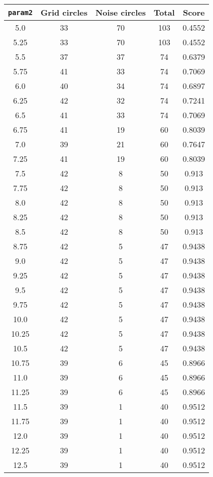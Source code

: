 \documentclass[letterpaper, 12pt]{article}
\begin{document}
\begin{longtable}{|c|c|c|c|c|}
\hline
\textbf{\texttt{param2}} & \textbf{Grid circles} & \textbf{Noise circles} & \textbf{Total} & \textbf{Score} \\
\hline
5.0 & 33 & 70 & 103 & 0.4552 \\
\hline
5.25 & 33 & 70 & 103 & 0.4552 \\
\hline
5.5 & 37 & 37 & 74 & 0.6379 \\
\hline
5.75 & 41 & 33 & 74 & 0.7069 \\
\hline
6.0 & 40 & 34 & 74 & 0.6897 \\
\hline
6.25 & 42 & 32 & 74 & 0.7241 \\
\hline
6.5 & 41 & 33 & 74 & 0.7069 \\
\hline
6.75 & 41 & 19 & 60 & 0.8039 \\
\hline
7.0 & 39 & 21 & 60 & 0.7647 \\
\hline
7.25 & 41 & 19 & 60 & 0.8039 \\
\hline
7.5 & 42 & 8 & 50 & 0.913 \\
\hline
7.75 & 42 & 8 & 50 & 0.913 \\
\hline
8.0 & 42 & 8 & 50 & 0.913 \\
\hline
8.25 & 42 & 8 & 50 & 0.913 \\
\hline
8.5 & 42 & 8 & 50 & 0.913 \\
\hline
8.75 & 42 & 5 & 47 & 0.9438 \\
\hline
9.0 & 42 & 5 & 47 & 0.9438 \\
\hline
9.25 & 42 & 5 & 47 & 0.9438 \\
\hline
9.5 & 42 & 5 & 47 & 0.9438 \\
\hline
9.75 & 42 & 5 & 47 & 0.9438 \\
\hline
10.0 & 42 & 5 & 47 & 0.9438 \\
\hline
10.25 & 42 & 5 & 47 & 0.9438 \\
\hline
10.5 & 42 & 5 & 47 & 0.9438 \\
\hline
10.75 & 39 & 6 & 45 & 0.8966 \\
\hline
11.0 & 39 & 6 & 45 & 0.8966 \\
\hline
11.25 & 39 & 6 & 45 & 0.8966 \\
\hline
11.5 & 39 & 1 & 40 & 0.9512 \\
\hline
11.75 & 39 & 1 & 40 & 0.9512 \\
\hline
12.0 & 39 & 1 & 40 & 0.9512 \\
\hline
12.25 & 39 & 1 & 40 & 0.9512 \\
\hline
12.5 & 39 & 1 & 40 & 0.9512 \\

\end{longtable}
\end{document}
